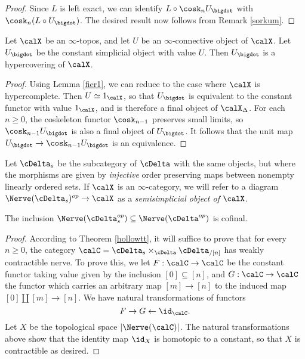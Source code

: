 \begin{proof}
Since $L$ is left exact, we can identify $L \circ \cosk_{n} U_{\bigdot}$ with
$\cosk_{n} (L \circ U_{\bigdot})$. The desired result now follows from Remark \ref{sorkum}.
\end{proof}

\begin{lemma}\label{fier0}
Let $\calX$ be an $\infty$-topos, and let $U$ be an $\infty$-connective object of $\calX$.
Let $U_{\bigdot}$ be the constant simplicial object with value $U$.
Then $U_{\bigdot}$ is a hypercovering of $\calX$.
\end{lemma}

\begin{proof}
Using Lemma \ref{fier1}, we can reduce to the case where $\calX$ is hypercomplete.
Then $U \simeq 1_{\calX}$, so that $U_{\bigdot}$ is equivalent to the constant functor with value $1_{\calX}$, and is therefore a final object of $\calX_{\Delta}$. For each $n \geq 0$, the coskeleton functor $\cosk_{n-1}$ preserves small limits, so $\cosk_{n-1} U_{\bigdot}$ is also a final object of $U_{\bigdot}$. It follows that the unit map $U_{\bigdot} \rightarrow \cosk_{n-1} U_{\bigdot}$ is an equivalence.
\end{proof}



\begin{notation}
Let $\cDelta_{s}$ be the subcategory of $\cDelta$ with the same objects, but where the morphisms are given by {\em injective} order preserving maps between nonempty linearly ordered sets.
If $\calX$ is an $\infty$-category, we will refer to a diagram $\Nerve(\cDelta_{s})^{op} \rightarrow \calX$ as a {\it semisimplicial object of $\calX$}.
\end{notation}

\begin{lemma}\label{bball4}
The inclusion $\Nerve(\cDelta^{op}_{s}) \subseteq \Nerve(\cDelta^{op})$ is cofinal. 
\end{lemma}

\begin{proof}
According to Theorem \ref{hollowtt}, it will suffice to prove that for every $n \geq 0$, the 
category $\calC = \cDelta_{s} \times_{\cDelta} \cDelta_{/ [n]}$ has weakly contractible nerve.
To prove this, we let $F: \calC \rightarrow \calC$ be the constant functor taking value given by the inclusion $[0] \subseteq [n]$, and $G: \calC \rightarrow \calC$ the functor which carries
an arbitrary map $[m] \rightarrow [n]$ to the induced map
$[0] \amalg [m] \rightarrow [n]$. We have natural transformations of functors
$$ F \rightarrow G \leftarrow \id_{\calC}. $$
Let $X$ be the topological space $| \Nerve(\calC) |$. The natural transformations above show that the identity map $\id_{X}$ is homotopic to a constant, so that $X$ is contractible as desired.
\end{proof}

